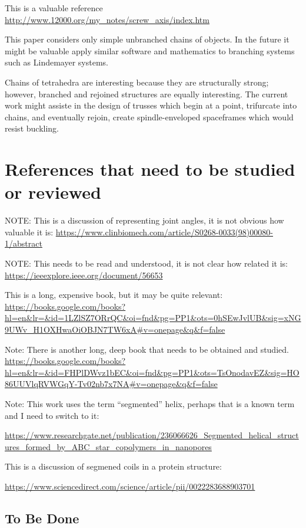 \documentclass[11pt]{article}
\begin{document}
{This is a valuable reference
\url{http://www.12000.org/my_notes/screw_axis/index.htm}

This paper considers only simple unbranched chains of objects. In the
future it might be valuable apply similar software and mathematics to
branching systems such as Lindemayer systems\cite{prusinkiewicz2013lindenmayer}.

Chains of tetrahedra are interesting because they are structurally strong;
however, branched and rejoined structures are equally interesting.
The current work might assiste in the design of trusses which begin at
a point, trifurcate into chains, and eventually rejoin, create spindle-enveloped
spaceframes which would resist buckling.

\section{References that need to be studied or reviewed}

NOTE: This is a discussion of representing joint angles, it is not obvious how valuable it is:
\url{https://www.clinbiomech.com/article/S0268-0033(98)00080-1/abstract}

NOTE: This needs to be read and understood, it is not clear how related it is:
\url{https://ieeexplore.ieee.org/document/56653}

This is a long, expensive book, but it may be quite relevant\cite{hyde1996language}:
\url{https://books.google.com/books?hl=en&lr=&id=1LZlSZ7ORrQC&oi=fnd&pg=PP1&ots=0hSEwJvlUB&sig=xNG9UWv_H1OXHwaOiOBJN7TW6xA#v=onepage&q&f=false}

Note: There is another long, deep book that needs to be obtained and studied\cite{sadoc2006geometrical}.
\url{https://books.google.com/books?hl=en&lr=&id=FHPlDWvz1bEC&oi=fnd&pg=PP1&ots=TsOnodavEZ&sig=HO86UUVlqRVWGqY-Tv02nb7x7NA#v=onepage&q&f=false}


Note: This work uses the term ``segmented'' helix, perhaps that is a known term and I need to switch to it:

\url{https://www.researchgate.net/publication/236066626_Segmented_helical_structures_formed_by_ABC_star_copolymers_in_nanopores}

This is a discussion of segmened coils in a protein structure:

\url{https://www.sciencedirect.com/science/article/pii/0022283688903701}

\subsection{To Be Done}

}
\end{document}
